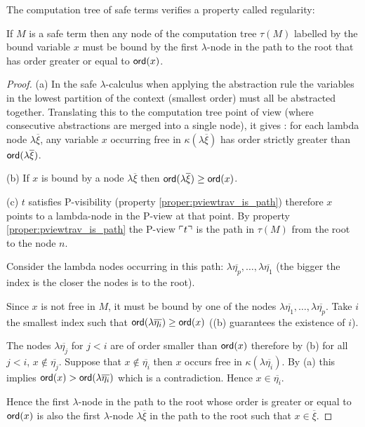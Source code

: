 The computation tree of safe terms verifies a property called regularity:
\begin{property}
\label{proper:regularity}
If $M$ is a safe term then any node of the computation tree $\tau(M)$ labelled by the bound variable $x$ must be
bound by the first $\lambda$-node in the path to the root that has
order greater or equal to ${\sf ord}(x)$.
\end{property}
\begin{proof}
(a) In the safe $\lambda$-calculus when applying the abstraction rule the variables in the lowest partition of the context
(smallest order) must all be abstracted together. Translating this to the computation tree point of view
(where consecutive abstractions are merged into a single node), it gives :
for each lambda node $\lambda \overline{\xi}$, any variable $x$ occurring free in $\kappa(\lambda \overline{\xi})$
has order strictly greater than ${\sf ord}(\lambda \overline{\xi})$.

(b) If $x$ is bound by a node $\lambda \overline{\xi}$ then
${\sf ord}(\lambda \overline{\xi}) \geq {\sf ord}(x)$.

(c) $t$ satisfies P-visibility (property \ref{proper:pviewtrav_is_path}) therefore $x$ points
to a lambda-node in the P-view at that point.
By property \ref{proper:pviewtrav_is_path} the P-view $\ulcorner t \urcorner$ is
the path in $\tau(M)$ from the root to the node $n$.

Consider the lambda nodes occurring in this path:
$\lambda \overline{\eta_p}, \ldots, \lambda \overline{\eta_1}$
(the bigger the index is the closer the nodes is to the root).

Since $x$ is not free in $M$, it must be bound by one of the nodes
$\lambda \overline{\eta_1}, \ldots, \lambda \overline{\eta_p}$.
Take $i$ the smallest index such that ${\sf ord}(\lambda \overline{\eta_i}) \geq {\sf ord}(x)$ ((b) guarantees the existence of $i$).

The nodes $\lambda \overline{\eta_j}$ for $j<i$ are of order smaller than ${\sf ord}(x)$ therefore
by (b) for all $j<i$, $x \not\in \overline{\eta_j}$. Suppose that $x \not\in \overline{\eta_i}$ then $x$ occurs free in
$\kappa(\lambda \overline{\eta_i})$. By (a) this implies
${\sf ord}(x) > {\sf ord}(\lambda \overline{\eta_i})$ which is a contradiction.
Hence $x \in \overline{\eta_i}$.

Hence the first $\lambda$-node in the path to the root whose order is greater or equal to ${\sf ord}(x)$
is also the first $\lambda$-node $\lambda \overline{\xi}$ in the path to the root such that $x \in \overline{\xi}$.
\end{proof}


